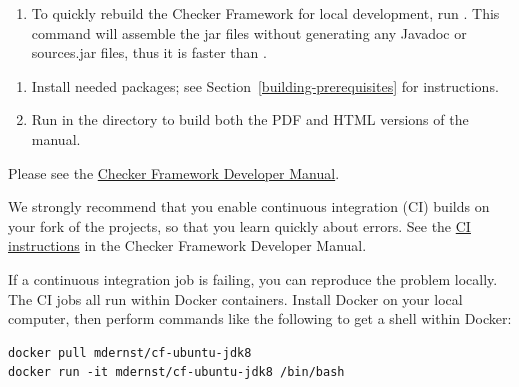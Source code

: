 \begin{enumerate}
\begin{itemize}
  \item Run the Nullness Checker examples (see
    Section~).

  \end{itemize}

\item To quickly rebuild the Checker Framework for local development,
run . This command will assemble the jar
files without generating any Javadoc or sources.jar files, thus it is
faster than .

\end{enumerate}



\begin{enumerate}
\item
Install needed packages; see Section~\ref{building-prerequisites} for
instructions.

\item
Run  in the  directory to build both the PDF and HTML versions of the manual.
\end{enumerate}



Please see the
\href{https://htmlpreview.github.io/?https://github.com/eisop/checker-framework/master/docs/developer/developer-manual.html}{Checker Framework Developer Manual}.



We strongly recommend that you enable continuous integration (CI) builds on
your fork of the projects, so that you learn quickly about errors.  See the
\href{https://htmlpreview.github.io/?https://github.com/eisop/checker-framework/master/docs/developer/developer-manual.html\#ci}{CI
  instructions} in the Checker Framework Developer Manual.



If a continuous integration job is failing, you can reproduce the problem locally.
The CI jobs all run within Docker containers.
Install Docker on your local computer, then perform commands like the
following to get a shell within Docker:

\begin{Verbatim}
docker pull mdernst/cf-ubuntu-jdk8
docker run -it mdernst/cf-ubuntu-jdk8 /bin/bash
\end{Verbatim}

